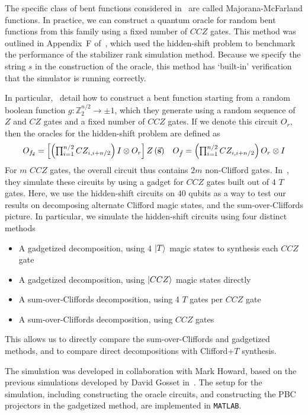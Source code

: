 The specific class of bent functions considered in~\cite{Roetteler2008} are called Majorana-McFarland functions. In practice, we can construct a quantum oracle for random bent functions from this family using a fixed number of $CCZ$ gates. This method was outlined in Appendix~F of~\cite{Bravyi2016}, which used the hidden-shift problem to benchmark the performance of the stabilizer rank simulation method. Because we specify the string $s$ in the construction of the oracle, this method has `built-in' verification that the simulator is running correctly.\par
In particular,~\cite{Bravyi2016} detail how to construct a bent function starting from a random boolean function $g:\mathbb{Z}_{2}^{n/2}\rightarrow \pm 1$, which they generate using a random sequence of $Z$ and $CZ$ gates and a fixed number of $CCZ$ gates. If we denote this circuit $O_{r}$, then the oracles for the hidden-shift problem are defined as
\begin{equation}
\begin{array}{l r}
 O_{f_{\va{s}}} = \left[\left(\prod_{i=1}^{n/2}CZ_{i,i+n/2}\right)I\otimes O_{r}\right] Z\left(\va{s}\right) & O_{\tilde{f}} = \left(\prod_{i=1}^{n/2}CZ_{i,i+n/2}\right)O_{r}\otimes I
\end{array}
\end{equation}
For $m$ $CCZ$ gates, the overall circuit thus contains $2m$ non-Clifford gates. In~\cite{Bravyi2016}, they simulate these circuits by using a gadget for $CCZ$ gates built out of $4$ $T$ gates. Here, we use the hidden-shift circuits on $40$ qubits as a way to test our results on decomposing alternate Clifford magic states, and the sum-over-Cliffords picture. In particular, we simulate the hidden-shift circuits using four distinct methods
\begin{itemize}
    \item A gadgetized decomposition, using $4$ $\ket{T}$ magic states to synthesis each $CCZ$ gate
    \item A gadgetized decomposition, using $\ket{CCZ}$ magic states directly
    \item A sum-over-Cliffords decomposition, using 4 $T$ gates per $CCZ$ gate
    \item A sum-over-Cliffords decomposition, using $CCZ$ gates
\end{itemize}
This allows us to directly compare the sum-over-Cliffords and gadgetized methods, and to compare direct decompositions with Clifford+$T$ synthesis.\par
The simulation was developed in collaboration with Mark Howard, based on the previous simulations developed by David Gosset in~\cite{Bravyi2016}. The setup for the simulation, including constructing the oracle circuits, and constructing the PBC projectors in the gadgetized method, are implemented in \texttt{MATLAB}.\par
